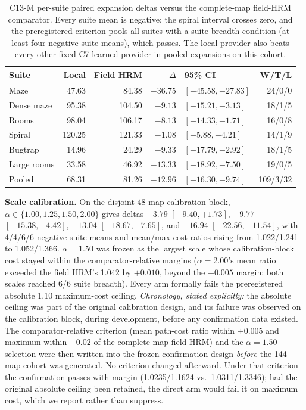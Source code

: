 \documentclass[letterpaper]{article} %
\newcommand{\stage}[1]{\textsc{#1}}
\begin{document}
\begin{table}[t]
\centering
\small
\setlength{\tabcolsep}{2.5pt}
\begin{tabular}{@{}lrrrlr@{}}
\toprule
Suite & Local & Field HRM & $\Delta$ & 95\% CI & W/T/L \\
\midrule
Maze & 47.63 & 84.38 & $-36.75$ & $[-45.58,-27.83]$ & 24/0/0 \\
Dense maze & 95.38 & 104.50 & $-9.13$ & $[-15.21,-3.13]$ & 18/1/5 \\
Rooms & 98.04 & 106.17 & $-8.13$ & $[-14.33,-1.71]$ & 16/0/8 \\
Spiral & 120.25 & 121.33 & $-1.08$ & $[-5.88,+4.21]$ & 14/1/9 \\
Bugtrap & 14.96 & 24.29 & $-9.33$ & $[-17.79,-2.92]$ & 18/1/5 \\
Large rooms & 33.58 & 46.92 & $-13.33$ & $[-18.92,-7.50]$ & 19/0/5 \\
\midrule
Pooled & 68.31 & 81.26 & $-12.96$ & $[-16.30,-9.74]$ & 109/3/32 \\
\bottomrule
\end{tabular}
\caption{\stage{C13-M} per-suite paired expansion deltas versus the complete-map field-HRM comparator. Every suite mean is negative; the spiral interval crosses zero, and the preregistered criterion pools all suites with a suite-breadth condition (at least four negative suite means), which passes. The local provider also beats every other fixed \stage{C7} learned provider in pooled expansions on this cohort.}
\label{tab:c13msuite}
\end{table}

\textbf{Scale calibration.} On the disjoint 48-map calibration block, $\alpha\in\{1.00,1.25,1.50,2.00\}$ gives deltas $-3.79$ $[-9.40,+1.73]$, $-9.77$ $[-15.38,-4.42]$, $-13.04$ $[-18.67,-7.65]$, and $-16.94$ $[-22.56,-11.54]$, with 4/4/6/6 negative suite means and mean/max cost ratios rising from 1.022/1.241 to 1.052/1.366. $\alpha{=}1.50$ was frozen as the largest scale whose calibration-block cost stayed within the comparator-relative margins ($\alpha{=}2.00$'s mean ratio exceeded the field HRM's 1.042 by $+0.010$, beyond the $+0.005$ margin; both scales reached 6/6 suite breadth). Every arm formally fails the preregistered absolute 1.10 maximum-cost ceiling. \emph{Chronology, stated explicitly:} the absolute ceiling was part of the original calibration design, and its failure was observed on the calibration block, during development, before any confirmation data existed. The comparator-relative criterion (mean path-cost ratio within $+0.005$ and maximum within $+0.02$ of the complete-map field HRM) and the $\alpha{=}1.50$ selection were then written into the frozen confirmation design \emph{before} the 144-map cohort was generated. No criterion changed afterward. Under that criterion the confirmation passes with margin (1.0235/1.1624 vs.\ 1.0311/1.3346); had the original absolute ceiling been retained, the direct arm would fail it on maximum cost, which we report rather than suppress.
\end{document}

